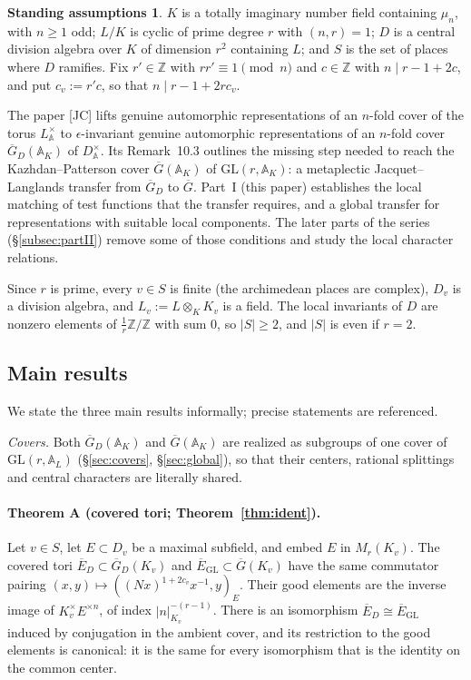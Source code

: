 \documentclass[12pt]{article}
\newcommand{\ov}[1]{\overline{#1}}
\newcommand{\eps}{\epsilon}
\newcommand{\A}{\mathbb{A}}
\newcommand{\Z}{\mathbb{Z}}
\newcommand{\GL}{\mathrm{GL}}
\newcommand{\Gb}{\ov{G}}
\newcommand{\GDb}{\ov{G}_D}
\newcommand{\Eb}{\ov{E}}
\theoremstyle{plain}
\theoremstyle{definition}
\newtheorem{assumption}[theorem]{Standing assumptions}
\begin{document}
\begin{assumption}\label{ass:standing}
$K$ is a totally imaginary number field containing $\mu_n$, with $n\ge1$ odd; $L/K$ is cyclic of prime degree $r$ with $(n,r)=1$; $D$ is a central division algebra over $K$ of dimension $r^2$ containing $L$; and $S$ is the set of places where $D$ ramifies. Fix $r'\in\Z$ with $rr'\equiv1\pmod n$ and $c\in\Z$ with $n\mid r-1+2c$, and put $c_v:=r'c$, so that $n\mid r-1+2rc_v$.
\end{assumption}

The paper [JC] lifts genuine automorphic representations of an $n$-fold cover of the torus $L^\times_{\A}$ to $\eps$-invariant genuine automorphic representations of an $n$-fold cover $\GDb(\A_K)$ of $D^\times_{\A}$. Its Remark~10.3 outlines the missing step needed to reach the Kazhdan--Patterson cover $\Gb(\A_K)$ of $\GL(r,\A_K)$: a metaplectic Jacquet--Langlands transfer from $\GDb$ to $\Gb$. Part~I (this paper) establishes the local matching of test functions that the transfer requires, and a global transfer for representations with suitable local components. The later parts of the series (\S\ref{subsec:partII}) remove some of those conditions and study the local character relations.

Since $r$ is prime, every $v\in S$ is finite (the archimedean places are complex), $D_v$ is a division algebra, and $L_v:=L\otimes_KK_v$ is a field. The local invariants of $D$ are nonzero elements of $\frac1r\Z/\Z$ with sum $0$, so $|S|\ge2$, and $|S|$ is even if $r=2$.

\subsection{Main results}\label{subsec:mainresults}
We state the three main results informally; precise statements are referenced.

\emph{Covers.} Both $\GDb(\A_K)$ and $\Gb(\A_K)$ are realized as subgroups of one cover of $\GL(r,\A_L)$ (\S\ref{sec:covers}, \S\ref{sec:global}), so that their centers, rational splittings and central characters are literally shared.

\paragraph{Theorem A (covered tori; Theorem~\ref{thm:ident}).} Let $v\in S$, let $E\subset D_v$ be a maximal subfield, and embed $E$ in $M_r(K_v)$. The covered tori $\Eb_D\subset\GDb(K_v)$ and $\Eb_{\GL}\subset\Gb(K_v)$ have the same commutator pairing $(x,y)\mapsto((Nx)^{1+2c_v}x^{-1},y)_E$. Their good elements are the inverse image of $K_v^\times E^{\times n}$, of index $|n|_{K_v}^{-(r-1)}$. There is an isomorphism $\Eb_D\cong\Eb_{\GL}$ induced by conjugation in the ambient cover, and its restriction to the good elements is canonical: it is the same for every isomorphism that is the identity on the common center.
\end{document}
